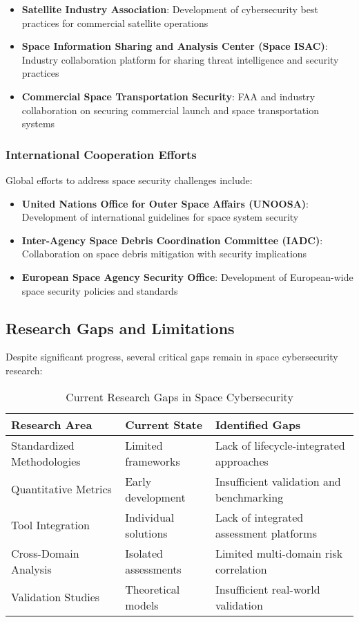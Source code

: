 \documentclass[binding=0.6cm]{sapthesis}
\begin{document}
\begin{itemize}
    \item \textbf{Satellite Industry Association}: Development of cybersecurity best practices for commercial satellite operations
    \item \textbf{Space Information Sharing and Analysis Center (Space ISAC)}: Industry collaboration platform for sharing threat intelligence and security practices
    \item \textbf{Commercial Space Transportation Security}: FAA and industry collaboration on securing commercial launch and space transportation systems
\end{itemize}

\subsubsection{International Cooperation Efforts}

Global efforts to address space security challenges include:

\begin{itemize}
    \item \textbf{United Nations Office for Outer Space Affairs (UNOOSA)}: Development of international guidelines for space system security
    \item \textbf{Inter-Agency Space Debris Coordination Committee (IADC)}: Collaboration on space debris mitigation with security implications
    \item \textbf{European Space Agency Security Office}: Development of European-wide space security policies and standards
\end{itemize}

\subsection{Research Gaps and Limitations}

Despite significant progress, several critical gaps remain in space cybersecurity research:

\begin{table}[H]
\centering
\caption{Current Research Gaps in Space Cybersecurity}
\begin{tabular}{|l|l|l|}
\hline
\textbf{Research Area} & \textbf{Current State} & \textbf{Identified Gaps} \\ \hline
Standardized Methodologies & Limited frameworks & Lack of lifecycle-integrated approaches \\ \hline
Quantitative Metrics & Early development & Insufficient validation and benchmarking \\ \hline
Tool Integration & Individual solutions & Lack of integrated assessment platforms \\ \hline
Cross-Domain Analysis & Isolated assessments & Limited multi-domain risk correlation \\ \hline
Validation Studies & Theoretical models & Insufficient real-world validation \\ \hline
\end{tabular}
\end{table}
\end{document}
